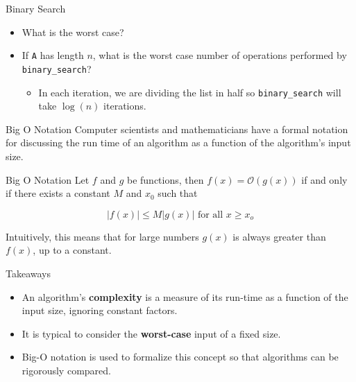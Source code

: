 \documentclass[serif,xcolor=pdftex,dvipsnames,table,hyperref={bookmarks=false,breaklinks}]{beamer}
\begin{document}
\begin{frame}[t,fragile]{Binary Search}
	\begin{itemize}[<+->]
		\item What is the worst case?
		\item If \verb|A| has length $n$, what is the worst case number of operations performed by \verb|binary_search|?
		\begin{itemize}[<+->]
			\item In each iteration, we are dividing the list in half so \verb|binary_search| will take $\log(n)$ iterations.
		\end{itemize}
	\end{itemize}
\end{frame}

\begin{frame}[t]{Big O Notation}
	Computer scientists and mathematicians have a formal notation for discussing the run time of an algorithm as a function of the algorithm's input size.
	
	\pause
	\begin{block}{Big O Notation}
		Let $f$ and $g$ be functions, then $f(x) = \mathcal{O}(g(x))$ if and only if there exists a constant $M$ and $x_0$ such that
		
		$$|f(x)| \leq M|g(x)| \text{ for all } x \geq x_o$$
		
		Intuitively, this means that for large numbers $g(x)$ is always greater than $f(x)$, up to a constant.
	\end{block}
\end{frame}

\begin{frame}[t]{Big O Notation}
	\centering
	\texttt{[image: \{../Figures/big\_o]}.pdf}
\end{frame}

\begin{frame}[t]{Takeaways}
	\begin{itemize}[<+->]
		\item An algorithm's \textbf{complexity} is a measure of its run-time as a function of the input size, ignoring constant factors.
		\item It is typical to consider the \textbf{worst-case} input of a fixed size.
		\item Big-O notation is used to formalize this concept so that algorithms can be rigorously compared.
	\end{itemize}
\end{frame}
\end{document}
